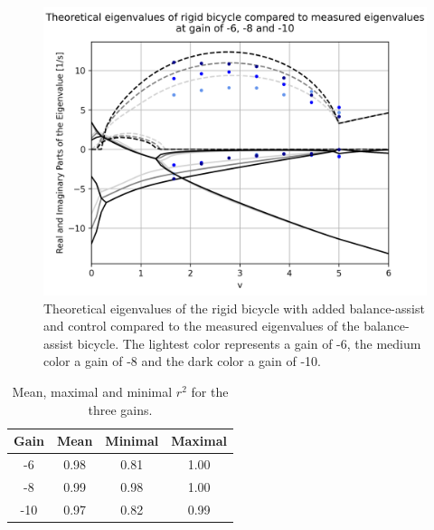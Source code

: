 \documentclass[12pt]{article}
\begin{document}
\begin{figure}
    \centering
    \includegraphics[width=\columnwidth]{figures/all-gains.png}
    \caption{Theoretical eigenvalues of the rigid bicycle with added balance-assist and control compared to the
        measured eigenvalues of the balance-assist bicycle. The lightest color represents a gain of -6, the
        medium color a gain of -8 and the dark color a gain of -10.} \label{fig-all-gains}
\end{figure}

\begin{table}[]
    \centering
    \caption{Mean, maximal and minimal $r^2$ for the three gains.} \label{table-r-squared}
    \begin{tabular}{c|c|c|c}
        \textbf{Gain} & \textbf{Mean} & \textbf{Minimal} & \textbf{Maximal} \\ \hline
        -6            & 0.98          & 0.81             & 1.00             \\
        -8            & 0.99          & 0.98             & 1.00             \\
        -10           & 0.97          & 0.82             & 0.99
    \end{tabular}
\end{table}
\end{document}
